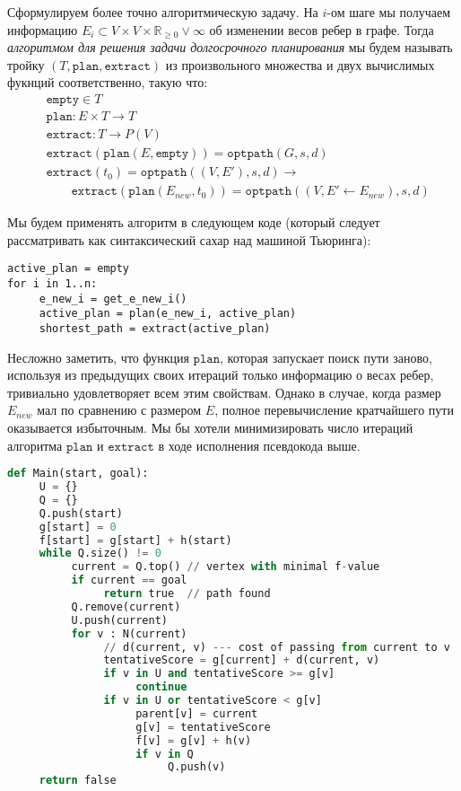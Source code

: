 \documentclass[11pt]{article}
\newcommand{\realpositive}{\mathbb{R}_{\geqslant 0}}
\begin{document}
     \pagebreak
     \newcommand{\fplan}{\mathtt{plan}}
     \newcommand{\fextract}{\mathtt{extract}}
     \newcommand{\fempty}{\mathtt{empty}}
     Сформулируем более точно алгоритмическую задачу.
     На $i$-ом шаге мы получаем информацию $E_i \subset V \times V \times \realpositive \lor \infty$ об изменении весов ребер в графе.
     Тогда \textit{алгоритмом для решения задачи долгосрочного планирования} мы будем называть тройку $(T, \fplan, \fextract)$ из произвольного множества и двух вычислимых фукнций соответственно, такую что:
     \begin{align*}
          &\fempty \in T \\
          &\fplan: E \times T \rightarrow T \\
          &\fextract: T \rightarrow P(V) \\
          &\fextract(\fplan(E, \fempty)) = \mathtt{optpath}(G, s, d) \\
          &\fextract(t_0) = \mathtt{optpath}((V, E'), s, d) \rightarrow \\
          &\qquad \fextract(\fplan(E_{new}, t_0)) = \mathtt{optpath}((V, E' \leftarrow E_{new}), s, d)
     \end{align*}

     Мы будем применять алгоритм в следующем коде (который следует рассматривать как синтаксический сахар над машиной Тьюринга):
     \begin{verbatim}
active_plan = empty
for i in 1..n:
     e_new_i = get_e_new_i()
     active_plan = plan(e_new_i, active_plan)
     shortest_path = extract(active_plan)
     \end{verbatim}
     Несложно заметить, что функция $\fplan$, которая запускает поиск пути заново, используя из предыдущих своих итераций только информацию о весах ребер, тривиально удовлетворяет всем этим свойствам.
     Однако в случае, когда размер $E_{new}$ мал по сравнению с размером $E$, полное перевычисление кратчайшего пути оказывается избыточным.
     Мы бы хотели минимизировать число итераций алгоритма $\fplan$ и $\fextract$ в ходе исполнения псевдокода выше.


\begin{lstlisting}[language=Python, caption=A*]
def Main(start, goal):
     U = {}
     Q = {}
     Q.push(start)
     g[start] = 0
     f[start] = g[start] + h(start)
     while Q.size() != 0
          current = Q.top() // vertex with minimal f-value
          if current == goal
               return true  // path found
          Q.remove(current)
          U.push(current)
          for v : N(current)
               // d(current, v) --- cost of passing from current to v
               tentativeScore = g[current] + d(current, v)
               if v in U and tentativeScore >= g[v]
                    continue
               if v in U or tentativeScore < g[v]
                    parent[v] = current
                    g[v] = tentativeScore
                    f[v] = g[v] + h(v)
                    if v in Q
                         Q.push(v)
     return false
\end{lstlisting}
\end{document}
